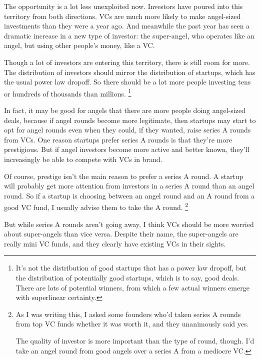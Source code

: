 \documentclass[12pt]{book}
\begin{document}
The opportunity is a lot less unexploited now. Investors have poured
into this territory from both directions. VCs are much more likely to
make angel-sized investments than they were a year ago. And meanwhile
the past year has seen a dramatic increase in a new type of investor:
the super-angel, who operates like an angel, but using other people's
money, like a VC.

Though a lot of investors are entering this territory, there is still
room for more. The distribution of investors should mirror the
distribution of startups, which has the usual power law dropoff. So
there should be a lot more people investing tens or hundreds of
thousands than millions. \footnote{It's not the distribution of good startups that has a power law
dropoff, but the distribution of potentially good startups, which is to
say, good deals. There are lots of potential winners, from which a few
actual winners emerge with superlinear certainty.}

In fact, it may be good for angels that there are more people doing
angel-sized deals, because if angel rounds become more legitimate, then
startups may start to opt for angel rounds even when they could, if they
wanted, raise series A rounds from VCs. One reason startups prefer
series A rounds is that they're more prestigious. But if angel investors
become more active and better known, they'll increasingly be able to
compete with VCs in brand.

Of course, prestige isn't the main reason to prefer a series A round. A
startup will probably get more attention from investors in a series A
round than an angel round. So if a startup is choosing between an angel
round and an A round from a good VC fund, I usually advise them to take
the A round. \footnote{As I was writing this, I asked some founders who'd taken series
A rounds from top VC funds whether it was worth it, and they unanimously
said yes.

The quality of investor is more important than the type of round,
though. I'd take an angel round from good angels over a series A from a
mediocre VC.}

But while series A rounds aren't going away, I think VCs should be more
worried about super-angels than vice versa. Despite their name, the
super-angels are really mini VC funds, and they clearly have existing
VCs in their sights.
\end{document}
